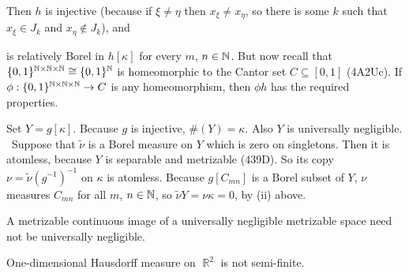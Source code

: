 {\noindent Then $h$ is injective (because if $\xi\ne\eta$ then
$x_{\xi}\ne x_{\eta}$, so there is some $k$ such that $x_{\xi}\in J_k$
and $x_{\eta}\notin J_k$), and


\noindent is relatively Borel in $h[\kappa]$ for every $m$,
$n\in\Bbb N$.   But now recall that
$\{0,1\}^{\Bbb N\times\Bbb N\times\Bbb N}\cong\{0,1\}^{\Bbb N}$ is
homeomorphic to the Cantor set $C\subseteq[0,1]$ (4A2Uc).   If
$\phi:\{0,1\}^{\Bbb N\times\Bbb N\times\Bbb N}\to C$ is any
homeomorphism,
then $\phi h$ has the required properties.\ \Qed

\medskip

 Set $Y=g[\kappa]$.   Because $g$ is injective,
$\#(Y)=\kappa$.   Also $Y$ is universally negligible.   \Prf\ Suppose
that $\tilde\nu$ is a Borel measure on $Y$ which is zero on singletons.
Then it is atomless, because $Y$ is separable and metrizable (439D).
So its copy $\nu=\tilde\nu(g^{-1})^{-1}$ on $\kappa$ is atomless.
Because $g[C_{mn}]$ is a Borel subset of $Y$, $\nu$ measures $C_{mn}$
for all $m$, $n\in\Bbb N$, so $\tilde\nu Y=\nu\kappa=0$, by (ii)
above.\ \Qed
}%

 A metrizable continuous image of a universally
negligible metrizable space need not be universally negligible.


 One-dimensional Hausdorff measure on $\BbbR^2$
is not semi-finite.

